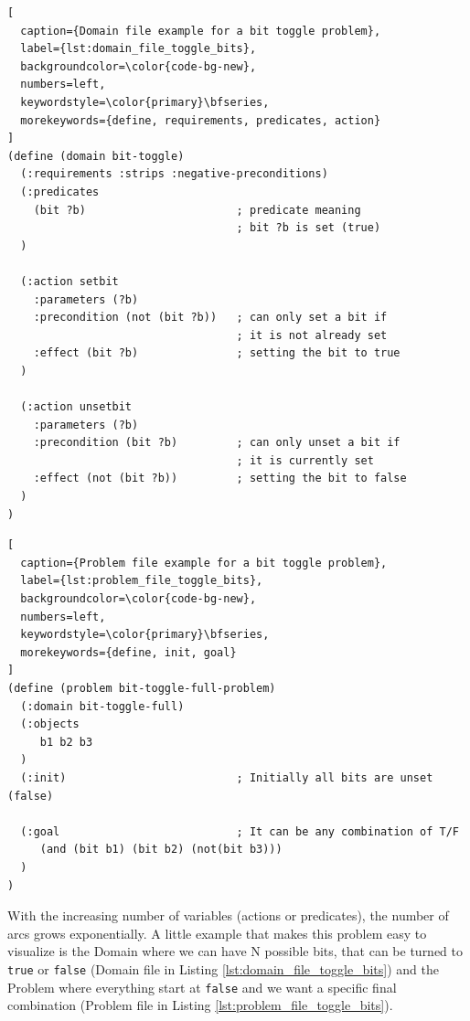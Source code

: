 \begin{lstlisting}[
  caption={Domain file example for a bit toggle problem},
  label={lst:domain_file_toggle_bits},
  backgroundcolor=\color{code-bg-new},
  numbers=left,
  keywordstyle=\color{primary}\bfseries,
  morekeywords={define, requirements, predicates, action}
]
(define (domain bit-toggle)
  (:requirements :strips :negative-preconditions)
  (:predicates
    (bit ?b)                       ; predicate meaning
                                   ; bit ?b is set (true)
  )

  (:action setbit
    :parameters (?b)
    :precondition (not (bit ?b))   ; can only set a bit if
                                   ; it is not already set
    :effect (bit ?b)               ; setting the bit to true
  )

  (:action unsetbit
    :parameters (?b)
    :precondition (bit ?b)         ; can only unset a bit if
                                   ; it is currently set
    :effect (not (bit ?b))         ; setting the bit to false
  )
)
\end{lstlisting}

\begin{lstlisting}[
  caption={Problem file example for a bit toggle problem},
  label={lst:problem_file_toggle_bits},
  backgroundcolor=\color{code-bg-new},
  numbers=left,
  keywordstyle=\color{primary}\bfseries,
  morekeywords={define, init, goal}
]
(define (problem bit-toggle-full-problem)
  (:domain bit-toggle-full)
  (:objects
     b1 b2 b3
  )
  (:init)                          ; Initially all bits are unset (false)

  (:goal                           ; It can be any combination of T/F
     (and (bit b1) (bit b2) (not(bit b3)))
  )
)
\end{lstlisting}

With the increasing number of variables (actions or predicates), the number of
arcs grows exponentially. A little example that makes this problem easy to visualize
is the Domain where we can have N possible bits, that can be turned to \texttt{true}
or \texttt{false} (Domain file in Listing \ref{lst:domain_file_toggle_bits}) and
the Problem where everything start at \texttt{false} and we want a specific final
combination (Problem file in Listing \ref{lst:problem_file_toggle_bits}).

